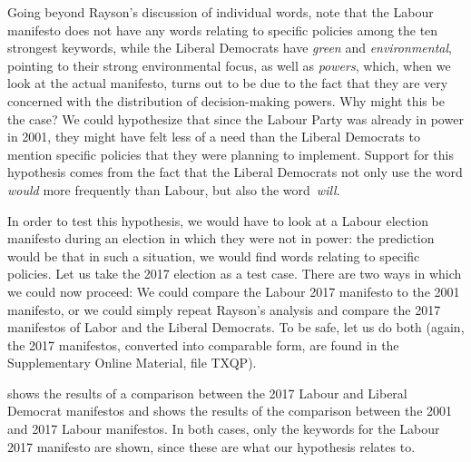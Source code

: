 Going beyond Rayson's discussion of individual words, note that the Labour manifesto does not have any words relating to specific policies among the ten strongest keywords,  while the Liberal Democrats have \textit{green} and \textit{environmental}, pointing to their strong environmental focus, as well as \textit{powers}, which, when we look at the actual manifesto, turns out to be due to the fact that they are very concerned with the distribution of decision\hyp{}making powers. Why might this be the case? We could hypothesize that since the Labour Party was already in power in 2001, they might have felt less of a need than the Liberal Democrats to mention specific policies that they were planning to implement. Support for this hypothesis comes from the fact that the Liberal Democrats not only use the word \textit{would} more frequently than Labour, but also the word \textit{will}.

In order to test this hypothesis, we would have to look at a Labour election manifesto during an election in which they were not in power: the prediction would be that in such a situation, we would find words relating to specific policies. Let us take the 2017 election as a test case. There are two ways in which we could now proceed: We could compare the Labour 2017 manifesto to the 2001 manifesto, or we could simply repeat Rayson's analysis and compare the 2017 manifestos of Labor and the Liberal Democrats. To be safe, let us do both (again, the 2017 manifestos, converted into comparable form, are found in the Supplementary Online Material, file TXQP).

 shows the results of a comparison between the 2017 Labour and Liberal Democrat manifestos and  shows the results of the comparison between the 2001 and 2017 Labour manifestos. In both cases, only the keywords  for the Labour 2017 manifesto are shown, since these are what our hypothesis relates to.

